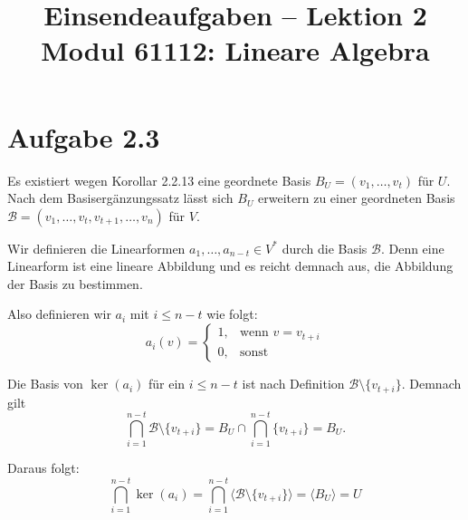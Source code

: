 \documentclass[a4paper,12pt]{article}
\title{Einsendeaufgaben -- Lektion 2\\[0.5em]
\large Modul 61112: Lineare Algebra}
\author{}
\date{}
\begin{document}
\maketitle

\section*{Aufgabe 2.3}

Es existiert wegen Korollar 2.2.13 eine geordnete Basis $B_U = (v_1, \ldots, v_t)$ für $U$.
Nach dem Basisergänzungssatz lässt sich $B_U$ erweitern zu einer geordneten Basis
$\mathcal{B} = (v_1, \ldots, v_t, v_{t+1}, \ldots, v_n)$ für $V$.

Wir definieren die Linearformen $a_1, \ldots, a_{n-t} \in V^*$ durch die Basis $\mathcal{B}$.
Denn eine Linearform ist eine lineare Abbildung und es reicht demnach aus,
die Abbildung der Basis zu bestimmen.

Also definieren wir $a_i$ mit $i \leq n-t$ wie folgt:
\[
  a_i(v) = \begin{cases} 1, & \text{wenn } v = v_{t+i} \\ 0, & \text{sonst} \end{cases}
\]

Die Basis von $\ker(a_i)$ für ein $i \leq n-t$ ist nach Definition $\mathcal{B} \setminus \{v_{t+i}\}$.
Demnach gilt
\[
  \bigcap_{i=1}^{n-t} \mathcal{B} \setminus \{v_{t+i}\} = B_U \cap \bigcap_{i=1}^{n-t} \{v_{t+i}\} = B_U.
\]

Daraus folgt:
\[
  \bigcap_{i=1}^{n-t} \ker(a_i)
  = \bigcap_{i=1}^{n-t} \langle \mathcal{B} \setminus \{v_{t+i}\} \rangle
  = \langle B_U \rangle
  = U
\]
\end{document}
